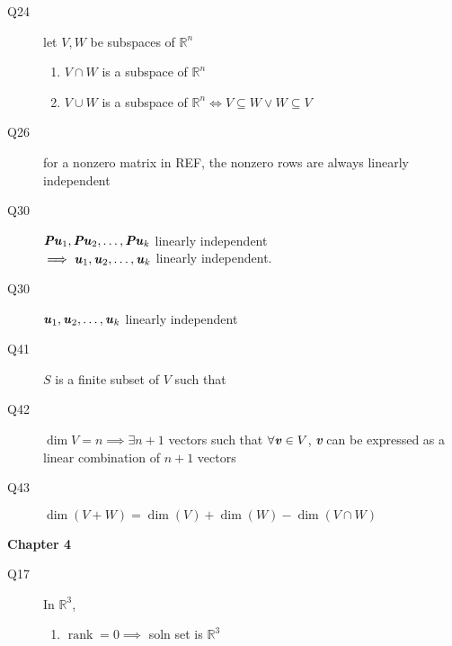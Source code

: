 \documentclass[landscape, a4paper]{article}
\newcommand{\R}{\mathbb{R}}
\newcommand{\V}[1]{\textbf{\textit{#1}}}
\newcommand{\rank}{\operatorname{rank}}
\newcommand{\Or}{\vee}
\newcommand{\Span}{\operatorname{span}}
\newcommand{\heading}[1]{
    \noindent\textbf{#1}
}
\begin{document}
\begin{multicols*}{4}
\begin{description}
        \item[Q24] let $V, W$ be subspaces of $\R^n$
            \begin{enumerate}
                \item $V\cap W$ is a subspace of $\R^n$
                \item $V\cup W$ is a subspace of $\R^n\iff V\subseteq W\Or W\subseteq V$
            \end{enumerate}
        \item[Q26] for a nonzero matrix in REF, the nonzero rows are always linearly independent
        \item[Q30] $\V{Pu}_1, \V{Pu}_2, \hdots, \V{Pu}_k$ linearly independent \\
            $\implies \V{u}_1, \V{u}_2, \hdots, \V{u}_k$ linearly independent.
        \item[Q30] $\V{u}_1, \V{u}_2, \hdots, \V{u}_k$ linearly independent
        \item[Q41] $S$ is a finite subset of $V$ such that
        \item[Q42] $\dim V=n\implies \exists n+1$ vectors such that $\forall \V{v}\in V$, \V{v} can be expressed as a linear combination of $n+1$ vectors
        \item[Q43] $\dim(V+W)=\dim(V) + \dim(W)- \dim(V\cap W)$
    \end{description}
    \heading{Chapter 4}
    \begin{description}
        \item[Q17] In $\R^3$,
            \begin{enumerate}
                \item $\rank = 0\implies$ soln set is $\R^3$

\end{enumerate}
\end{description}
\end{multicols*}
\end{document}
